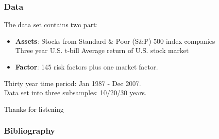 \documentclass[12pt]{beamer}
\begin{document}
\begin{frame}
\frametitle{Data}
The data set contains two part:
\begin{itemize}
\item {\bf Assets}: Stocks from Standard \& Poor (S\&P) 500 index companies\\
\subitem Three year U.S. t-bill
\subitem Average return of U.S. stock market
\item {\bf Factor}: 145 risk factors plus one market factor.\\
\end{itemize}

Thirty year time period: Jan 1987 - Dec 2007.\\
Data set into three subsamples: 10/20/30 years.\\
\end{frame}

\begin{frame}
	\centering	
\huge{ Thanks for listening\\}
\end{frame}


\begin{frame}[allowframebreaks]
	\frametitle{Bibliography}
	
{\footnotesize}
\end{frame}
\end{document}
